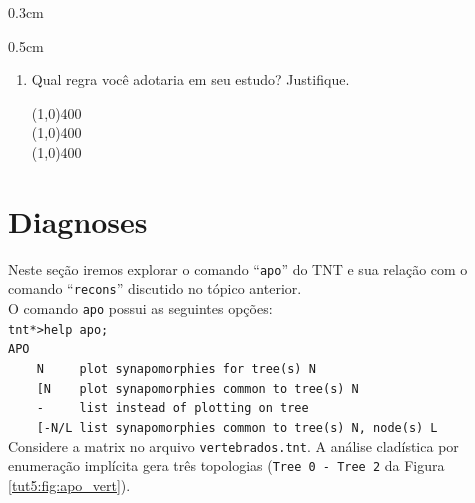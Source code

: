 \begin{refsection}
\begin {myindentpar}{0.3cm}
\begin{enumerate}[\itshape i.]
\begin {myindentpar}{0.5cm}
\begin{enumerate}[\itshape a.]
\begin{center}
			\line(1,0){400}\\
			\line(1,0){400}\\
			\end{center}
		\item{Qual regra você adotaria em seu estudo? Justifique.}
			\begin{center}
			\line(1,0){400}\\
			\line(1,0){400}\\
			\line(1,0){400}\\
			\end{center}
	  \end{enumerate}
	  \end{myindentpar}
  \end{enumerate}
  \end{myindentpar}

\section{Diagnoses}\label{tut5:apo}
	Neste seção iremos explorar o comando ``\texttt{apo}'' do TNT e sua relação com o comando ``\texttt{recons}'' discutido no tópico anterior.\\
	O comando \texttt{apo} possui as seguintes opções:\\
\texttt{tnt*>help apo;}\\
\texttt{APO}\\
\texttt{~~~~N~~~~~plot synapomorphies for tree(s) N }\\
\texttt{~~~~[N~~~~plot synapomorphies common to tree(s) N }\\
\texttt{~~~~-~~~~~list instead of plotting on tree }\\
\texttt{~~~~[-N/L~list synapomorphies common to tree(s) N, node(s) L }\\

Considere a matrix no arquivo \texttt{vertebrados.tnt}. A análise cladística por enumeração implícita gera três topologias (\texttt{Tree 0 - Tree 2} da Figura \ref{tut5:fig:apo_vert}).


\end{refsection}
